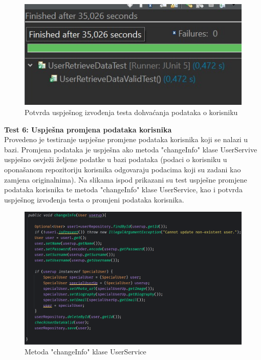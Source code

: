			\begin{figure}[H]
			\includegraphics[scale=0.4]{slike/JUnit_retrieve.JPG} %
			\centering
			\caption{Potvrda uspješnog izvođenja testa dohvaćanja podataka o korisniku}
			\label{Potvrda uspješnog izvođenja testa dohvaćanja podataka o korisniku}
		\end{figure}
		
\textbf{Test 6: Uspješna promjena podataka korisnika} \\
Provedeno je testiranje uspješne promjene podataka korisnika koji se nalazi u bazi. Promjena podataka je uspješna ako metoda "changeInfo" klase UserServive uspješno osvježi željene podatke u bazi podataka (podaci o korisniku u oponašanom repozitoriju korisnika odgovaraju podacima koji su zadani kao zamjena originalnima). Na slikama ispod prikazani su test uspješne promjene podataka korisnika te metoda "changeInfo" klase UserService, kao i potvrda uspješnog izvođenja testa o promjeni podataka korisnika.

				\begin{figure}[H]
			\includegraphics[scale=0.4]{slike/changeInfo.PNG} %
			\centering
			\caption{Metoda "changeInfo" klase UserService}
			\label{Metoda "changeInfo" klase UserService}
		\end{figure}
		
